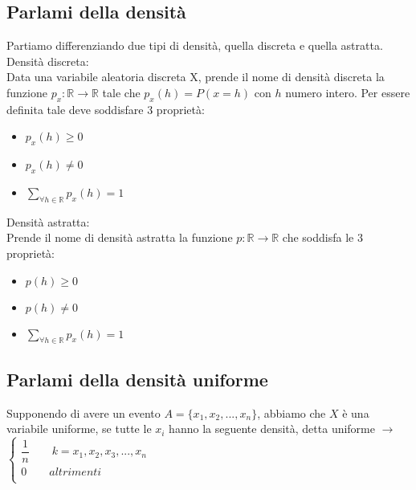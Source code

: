 \documentclass[a4paper,12pt]{report}
\begin{document}
	\subsection{Parlami della densità}
	Partiamo differenziando due tipi di densità, quella discreta e quella astratta.\\
	Densità discreta: \\
	Data  una variabile aleatoria discreta X, prende il nome di densità discreta la funzione $p_x : \mathbb{R} \rightarrow \mathbb{R}$ tale che $p_x(h) = P(x = h)$ con $h$ numero intero. Per essere definita tale deve soddisfare 3 proprietà:
	\begin{itemize}
		\item $p_x(h) \geq 0$
		\item $p_x(h) \neq 0$
		\item $\sum_{\forall h \in \mathbb{R}} p_x(h) = 1$
	\end{itemize}
	Densità astratta: \\
	Prende il nome di densità astratta la funzione $p : \mathbb{R} \rightarrow \mathbb{R}$ che soddisfa le 3 proprietà:
	\begin{itemize}
		\item $p(h) \geq 0$
		\item $p(h) \neq 0$
		\item $\sum_{\forall h \in \mathbb{R}} p_x(h) = 1$
	\end{itemize}
	\subsection{Parlami della densità uniforme}
	Supponendo di avere un evento $A = \{x_1, x_2, ..., x_n\}$, abbiamo che $X$ è una variabile uniforme, se tutte le $x_i$ hanno la seguente densità, detta uniforme $\rightarrow$ $
	\begin{cases}
		\dfrac{1}{n}\qquad  k = x_1, x_2, x_3, ... , x_n \\  
		0\qquad			 altrimenti \\
	\end{cases}
	$
	
\end{document}
